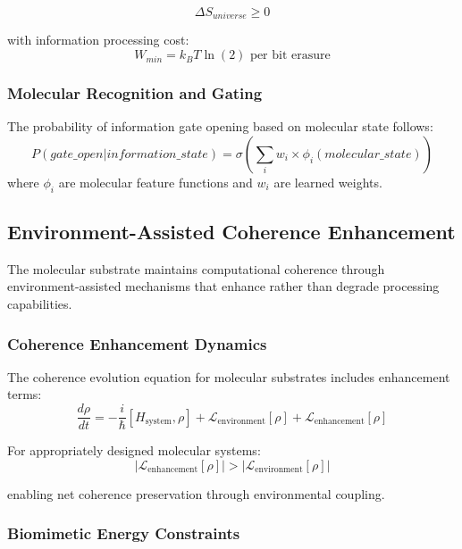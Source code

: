 \documentclass[12pt,a4paper]{article}
\begin{document}
\begin{equation}
\Delta S_{universe} \geq 0
\end{equation}

with information processing cost:
\begin{equation}
W_{min} = k_B T \ln(2) \text{ per bit erasure}
\end{equation}

\subsubsection{Molecular Recognition and Gating}

The probability of information gate opening based on molecular state follows:
\begin{equation}
P(gate\_open | information\_state) = \sigma\left(\sum_i w_i \times \phi_i(molecular\_state)\right)
\end{equation}
where $\phi_i$ are molecular feature functions and $w_i$ are learned weights.

\subsection{Environment-Assisted Coherence Enhancement}

The molecular substrate maintains computational coherence through environment-assisted mechanisms that enhance rather than degrade processing capabilities.

\subsubsection{Coherence Enhancement Dynamics}

The coherence evolution equation for molecular substrates includes enhancement terms:
\begin{equation}
\frac{d\rho}{dt} = -\frac{i}{\hbar}[H_{\text{system}}, \rho] + \mathcal{L}_{\text{environment}}[\rho] + \mathcal{L}_{\text{enhancement}}[\rho]
\end{equation}

For appropriately designed molecular systems:
\begin{equation}
|\mathcal{L}_{\text{enhancement}}[\rho]| > |\mathcal{L}_{\text{environment}}[\rho]|
\end{equation}

enabling net coherence preservation through environmental coupling.

\subsubsection{Biomimetic Energy Constraints}
\end{document}

